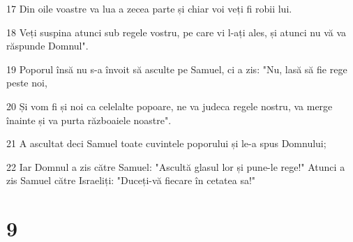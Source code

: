 \par 17 Din oile voastre va lua a zecea parte și chiar voi veți fi robii lui.
\par 18 Veți suspina atunci sub regele vostru, pe care vi l-ați ales, și atunci nu vă va răspunde Domnul".
\par 19 Poporul însă nu s-a învoit să asculte pe Samuel, ci a zis: "Nu, lasă să fie rege peste noi,
\par 20 Și vom fi și noi ca celelalte popoare, ne va judeca regele nostru, va merge înainte și va purta războaiele noastre".
\par 21 A ascultat deci Samuel toate cuvintele poporului și le-a spus Domnului;
\par 22 Iar Domnul a zis către Samuel: "Ascultă glasul lor și pune-le rege!" Atunci a zis Samuel către Israeliți: "Duceți-vă fiecare în cetatea sa!"

\chapter{9}

